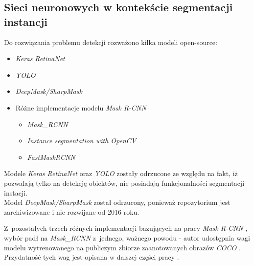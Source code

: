 \subsection{Sieci neuronowych w kontekście segmentacji instancji}

Do rozwiązania problemu detekcji rozważono kilka modeli open-source:

\begin{itemize}
	\item \textit{Keras RetinaNet} \cite{keras-retinanet} \cite{keras-retinanet-implementation}
	\item \textit{YOLO} \cite{yolo} \cite{yolo-implementation}
	\item \textit{DeepMask/SharpMask} \cite{deepmask} \cite{sharpmask} \cite{deep-sharp-mask}
	\item Różne implementacje modelu \textit{Mask R-CNN} \cite{general-mask-rcnn}
		\begin{itemize}
			\item \textit{Mask\_RCNN} \cite{matterport-mask-rcnn}
			\item \textit{Instance segmentation with OpenCV} \cite{mask-rcnn-opencv}
			\item \textit{FastMaskRCNN} \cite{fast-mask-rcnn}
		\end{itemize}
\end{itemize}

Modele \textit{Keras RetinaNet} oraz \textit{YOLO} zostały odrzucone ze względu na fakt, iż pozwalają tylko na detekcję obiektów, nie posiadają funkcjonalności segmentacji instacji. \\

Model \textit{DeepMask/SharpMask} został odrzucony, ponieważ repozytorium jest zarchiwizowane i nie rozwijane od 2016 roku.

Z~pozostałych trzech różnych implementacji bazujących na pracy \textit{Mask R-CNN} \cite{general-mask-rcnn}, wybór padł na \textit{Mask\_RCNN} \cite{matterport-mask-rcnn} z~jednego, ważnego powodu - autor udostępnia wagi modelu wytrenowanego na publiczym zbiorze zaanotowanych obrazów \textit{COCO} \cite{coco}.
Przydatność tych wag jest opisana w dalszej części pracy .
